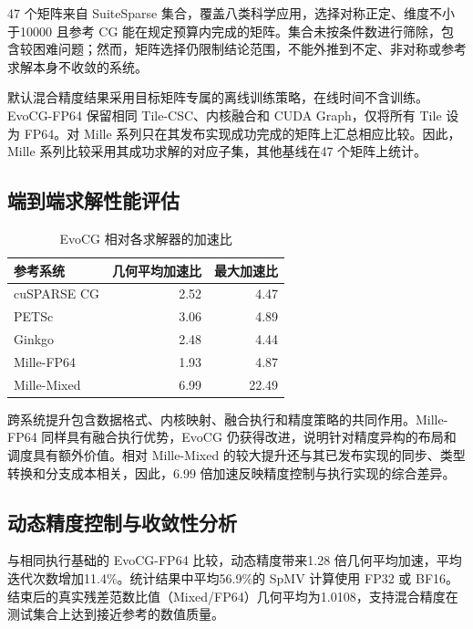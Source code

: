 47 个矩阵来自 SuiteSparse 集合\cite{davis2011}，覆盖八类科学应用，选择对称正定、维度不小于10000 且参考 CG 能在规定预算内完成的矩阵。集合未按条件数进行筛除，包含较困难问题；然而，矩阵选择仍限制结论范围，不能外推到不定、非对称或参考求解本身不收敛的系统。

默认混合精度结果采用目标矩阵专属的离线训练策略，在线时间不含训练。EvoCG-FP64 保留相同 Tile-CSC、内核融合和 CUDA Graph，仅将所有 Tile 设为 FP64。对 Mille 系列只在其发布实现成功完成的矩阵上汇总相应比较。因此，Mille 系列比较采用其成功求解的对应子集，其他基线在47 个矩阵上统计。

\subsection{端到端求解性能评估}

\begin{table}[htbp]\centering
\caption{EvoCG 相对各求解器的加速比}\label{tab:evo-speedup}
\begin{tabular}{lrr}\toprule
参考系统&几何平均加速比&最大加速比\\\midrule
cuSPARSE CG&2.52&4.47\\
PETSc&3.06&4.89\\
Ginkgo&2.48&4.44\\
Mille-FP64&1.93&4.87\\
Mille-Mixed&6.99&22.49\\\bottomrule
\end{tabular}
\end{table}

跨系统提升包含数据格式、内核映射、融合执行和精度策略的共同作用。Mille-FP64 同样具有融合执行优势，EvoCG 仍获得改进，说明针对精度异构的布局和调度具有额外价值。相对 Mille-Mixed 的较大提升还与其已发布实现的同步、类型转换和分支成本相关，因此，6.99 倍加速反映精度控制与执行实现的综合差异。

\subsection{动态精度控制与收敛性分析}
与相同执行基础的 EvoCG-FP64 比较，动态精度带来1.28 倍几何平均加速，平均迭代次数增加11.4\%。统计结果中平均56.9\%的 SpMV 计算使用 FP32 或 BF16。结束后的真实残差范数比值（Mixed/FP64）几何平均为1.0108，支持混合精度在测试集合上达到接近参考的数值质量。



